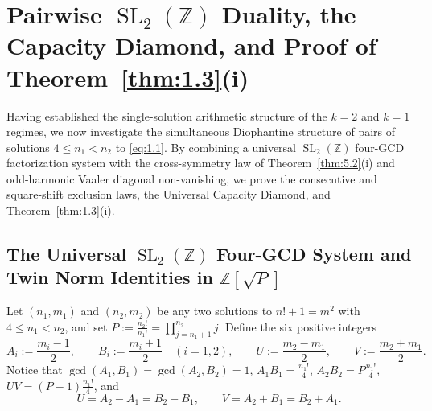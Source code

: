 \documentclass[11pt,reqno]{amsart}
\theoremstyle{remark}
\numberwithin{equation}{section}
\newcommand{\Z}{\mathbb{Z}}
\DeclareMathOperator{\SL}{SL}
\begin{document}
\section{Pairwise $\SL_2(\Z)$ Duality, the Capacity Diamond, and Proof of Theorem~\ref{thm:1.3}(i)}\label{sec:6}

Having established the single-solution arithmetic structure of the $k = 2$ and $k = 1$ regimes, we now investigate the simultaneous Diophantine structure of pairs of solutions $4 \le n_1 < n_2$ to \eqref{eq:1.1}. By combining a universal $\SL_2(\Z)$ four-GCD factorization system with the cross-symmetry law of Theorem~\ref{thm:5.2}(i) and odd-harmonic Vaaler diagonal non-vanishing, we prove the consecutive and square-shift exclusion laws, the Universal Capacity Diamond, and Theorem~\ref{thm:1.3}(i).

\subsection{The Universal $\SL_2(\Z)$ Four-GCD System and Twin Norm Identities in $\Z[\sqrt{P}]$}
Let $(n_1, m_1)$ and $(n_2, m_2)$ be any two solutions to $n! + 1 = m^2$ with $4 \le n_1 < n_2$, and set $P := \frac{n_2!}{n_1!} = \prod_{j=n_1+1}^{n_2} j$. Define the six positive integers
\begin{equation}\label{eq:6.1}
A_i := \frac{m_i - 1}{2}, \qquad B_i := \frac{m_i + 1}{2} \quad (i = 1, 2), \qquad U := \frac{m_2 - m_1}{2}, \qquad V := \frac{m_2 + m_1}{2}.
\end{equation}
Notice that $\gcd(A_1, B_1) = \gcd(A_2, B_2) = 1$, $A_1 B_1 = \frac{n_1!}{4}$, $A_2 B_2 = P\frac{n_1!}{4}$, $UV = (P - 1)\frac{n_1!}{4}$, and
\begin{equation}\label{eq:6.2}
U = A_2 - A_1 = B_2 - B_1, \qquad V = A_2 + B_1 = B_2 + A_1.
\end{equation}
\end{document}
